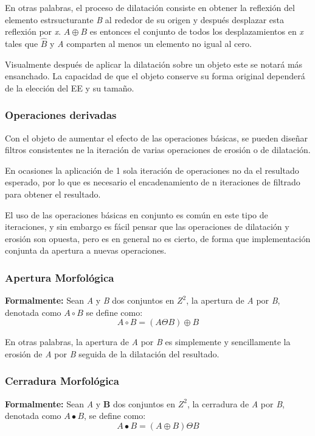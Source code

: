 		\hfill\break
		\justifying
		En otras palabras, el proceso de dilatación consiste en obtener la reflexión del elemento estrsucturante \textit{B} al rededor de su origen y después desplazar esta reflexión por \textit{x}. $A\oplus B$ es entonces el conjunto de todos los desplazamientos en \textit{x} tales que $\hat{B}$ y \textit{A} comparten al menos un elemento no igual al cero.
		
		\hfill\break
		\justifying
		Visualmente después de aplicar la dilatación sobre un objeto este se notará más ensanchado. La capacidad de que el objeto conserve su forma original dependerá de la elección del EE y su tamaño.

\subsubsection*{Operaciones derivadas}
	\hfill\break
	\justifying
	Con el objeto de aumentar el efecto de las operaciones básicas, se pueden diseñar filtros consistentes ne la iteración de varias operaciones de erosión o de dilatación.
	
	\hfill\break
	\justifying
	En ocasiones la aplicación de 1 sola iteración de operaciones no da el resultado esperado, por lo que es necesario el encadenamiento de n iteraciones de filtrado para obtener el resultado.
	
	\hfill\break
	\justifying
	El uso de las operaciones básicas en conjunto es común en este tipo de iteraciones, y sin embargo es fácil pensar que las operaciones de dilatación y erosión son opuesta, pero es en general no es cierto, de forma que implementación conjunta da apertura a nuevas operaciones.
	
	\subsubsection*{Apertura Morfológica}
		\hfill\break
		\justifying
		\textbf{Formalmente:} Sean \textit{A} y \textit{B} dos conjuntos en $Z^2$, la apertura de \textit{A} por \textit{B}, denotada como $A \circ B$ se define como:
		\begin{equation*}
			A \circ B = (A\Theta B) \oplus B
		\end{equation*}
	
		\hfill\break
		\justifying
		En otras palabras, la apertura de \textit{A} por \textit{B} es simplemente y sencillamente la erosión de \textit{A} por \textit{B} seguida de la dilatación del resultado.
		
	\subsubsection*{Cerradura Morfológica}
		\hfill\break
		\justifying
		\textbf{Formalmente:} Sean \textit{A} y \textbf{B} dos conjuntos en $Z^2$, la cerradura de \textit{A} por \textit{B}, denotada como $A \bullet B$, se define como:
		\begin{equation*}
			A\bullet B = (A\oplus B)\Theta B
		\end{equation*}
	
